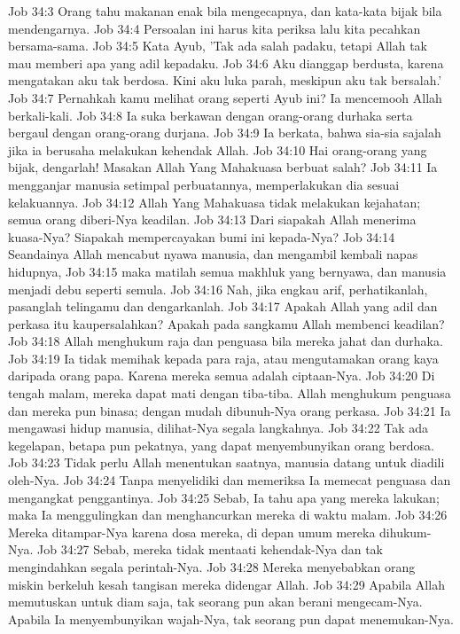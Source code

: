 Job 34:3  Orang tahu makanan enak bila mengecapnya, dan kata-kata bijak bila mendengarnya.
Job 34:4  Persoalan ini harus kita periksa lalu kita pecahkan bersama-sama.
Job 34:5  Kata Ayub, 'Tak ada salah padaku, tetapi Allah tak mau memberi apa yang adil kepadaku.
Job 34:6  Aku dianggap berdusta, karena mengatakan aku tak berdosa. Kini aku luka parah, meskipun aku tak bersalah.'
Job 34:7  Pernahkah kamu melihat orang seperti Ayub ini? Ia mencemooh Allah berkali-kali.
Job 34:8  Ia suka berkawan dengan orang-orang durhaka serta bergaul dengan orang-orang durjana.
Job 34:9  Ia berkata, bahwa sia-sia sajalah jika ia berusaha melakukan kehendak Allah.
Job 34:10  Hai orang-orang yang bijak, dengarlah! Masakan Allah Yang Mahakuasa berbuat salah?
Job 34:11  Ia mengganjar manusia setimpal perbuatannya, memperlakukan dia sesuai kelakuannya.
Job 34:12  Allah Yang Mahakuasa tidak melakukan kejahatan; semua orang diberi-Nya keadilan.
Job 34:13  Dari siapakah Allah menerima kuasa-Nya? Siapakah mempercayakan bumi ini kepada-Nya?
Job 34:14  Seandainya Allah mencabut nyawa manusia, dan mengambil kembali napas hidupnya,
Job 34:15  maka matilah semua makhluk yang bernyawa, dan manusia menjadi debu seperti semula.
Job 34:16  Nah, jika engkau arif, perhatikanlah, pasanglah telingamu dan dengarkanlah.
Job 34:17  Apakah Allah yang adil dan perkasa itu kaupersalahkan? Apakah pada sangkamu Allah membenci keadilan?
Job 34:18  Allah menghukum raja dan penguasa bila mereka jahat dan durhaka.
Job 34:19  Ia tidak memihak kepada para raja, atau mengutamakan orang kaya daripada orang papa. Karena mereka semua adalah ciptaan-Nya.
Job 34:20  Di tengah malam, mereka dapat mati dengan tiba-tiba. Allah menghukum penguasa dan mereka pun binasa; dengan mudah dibunuh-Nya orang perkasa.
Job 34:21  Ia mengawasi hidup manusia, dilihat-Nya segala langkahnya.
Job 34:22  Tak ada kegelapan, betapa pun pekatnya, yang dapat menyembunyikan orang berdosa.
Job 34:23  Tidak perlu Allah menentukan saatnya, manusia datang untuk diadili oleh-Nya.
Job 34:24  Tanpa menyelidiki dan memeriksa Ia memecat penguasa dan mengangkat penggantinya.
Job 34:25  Sebab, Ia tahu apa yang mereka lakukan; maka Ia menggulingkan dan menghancurkan mereka di waktu malam.
Job 34:26  Mereka ditampar-Nya karena dosa mereka, di depan umum mereka dihukum-Nya.
Job 34:27  Sebab, mereka tidak mentaati kehendak-Nya dan tak mengindahkan segala perintah-Nya.
Job 34:28  Mereka menyebabkan orang miskin berkeluh kesah tangisan mereka didengar Allah.
Job 34:29  Apabila Allah memutuskan untuk diam saja, tak seorang pun akan berani mengecam-Nya. Apabila Ia menyembunyikan wajah-Nya, tak seorang pun dapat menemukan-Nya.
